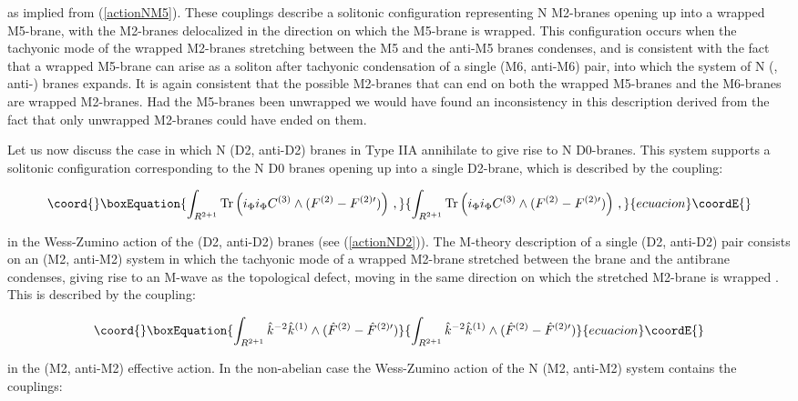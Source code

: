 \documentclass[12pt,a4paper]{article}
\begin{document}
\noindent as implied from (\ref{actionNM5}).
These couplings describe a solitonic
configuration representing N M2-branes opening up into a wrapped
M5-brane, with the M2-branes delocalized in the direction on which
the M5-brane is wrapped.
This configuration occurs when the tachyonic mode of the
wrapped M2-branes stretching between the M5 and the anti-M5 branes
condenses, and is consistent with the fact that a wrapped M5-brane
can arise as a soliton after tachyonic condensation of a single
(M6, anti-M6) pair, into which the system of N 
(\coordHE{}, anti-\coordHE{}) branes
expands. It is again consistent that the possible M2-branes that
can end on both the wrapped M5-branes and the M6-branes are wrapped
M2-branes. Had the M5-branes been unwrapped we would have found an
inconsistency in this description derived from the fact that only
unwrapped M2-branes could have ended on them.
 
Let us now discuss the case in which N (D2, anti-D2) branes
in Type IIA annihilate to give rise to N D0-branes. This system
supports a solitonic configuration corresponding to the N D0
branes opening up into a single D2-brane, which is described by the
coupling:

\begin{equation}\coord{}\boxEquation{
\label{D2antiD2}
\int_{R^{2+1}}{\rm Tr}\left(i_\Phi i_\Phi C^{(3)}\wedge 
(F^{(2)}-F^{(2)\prime})\right)\, ,
}{
\int_{R^{2+1}}{\rm Tr}\left(i_\Phi i_\Phi C^{(3)}\wedge 
(F^{(2)}-F^{(2)\prime})\right)\, ,
}{ecuacion}\coordE{}\end{equation}

\noindent in the Wess-Zumino action of the (D2, anti-D2) branes
(see (\ref{actionND2})).
The M-theory description of a single (D2, anti-D2) pair
consists on an (M2, anti-M2) system in which the tachyonic
mode of a wrapped M2-brane stretched between the brane and the
antibrane condenses, giving rise to an M-wave as the topological
defect, moving in the
same direction on which the stretched M2-brane is wrapped \cite{HL1}.
This is described by the coupling:

\begin{equation}\coord{}\boxEquation{
\int_{R^{2+1}} {\hat k}^{-2}{\hat k}^{(1)}\wedge 
({\hat F}^{(2)}-{\hat F}^{(2)\prime})
}{
\int_{R^{2+1}} {\hat k}^{-2}{\hat k}^{(1)}\wedge 
({\hat F}^{(2)}-{\hat F}^{(2)\prime})
}{ecuacion}\coordE{}\end{equation}

\noindent in the (M2, anti-M2) effective action.
In the non-abelian case the Wess-Zumino action of the 
N (M2, anti-M2) system contains the couplings:
\end{document}
